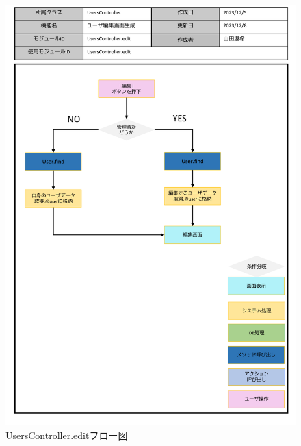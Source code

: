 \begin{figure}
    \centering
    \includegraphics[scale=0.7]{img/Users/pptx/UsersController_edit.pdf}
    \caption{UsersController.editフロー図}
\end{figure}




